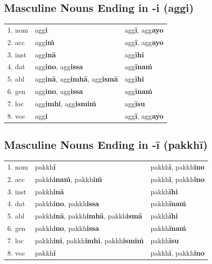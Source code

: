 \documentclass[11pt,oneside]{memoir}
\begin{document}
\subsection{Masculine Nouns Ending in -i (aggi)}
\label{sec:orgc8534b9}

\begin{center}
\begin{tabular}{lll}
1. nom & agg\textbf{i} & agg\textbf{ī}, agg\textbf{ayo}\\
2. acc & agg\textbf{iṁ} & agg\textbf{ī}, agg\textbf{ayo}\\
3. inst & agg\textbf{inā} & agg\textbf{īhi}\\
4. dat & agg\textbf{ino}, agg\textbf{issa} & agg\textbf{īnaṁ}\\
5. abl & agg\textbf{inā}, agg\textbf{imhā}, agg\textbf{ismā} & agg\textbf{īhi}\\
6. gen & agg\textbf{ino}, agg\textbf{issa} & agg\textbf{īnaṁ}\\
7. loc & agg\textbf{imhi}, agg\textbf{ismiṁ} & agg\textbf{īsu}\\
8. voc & agg\textbf{i} & agg\textbf{ī}, agg\textbf{ayo}\\
\end{tabular}
\end{center}
\subsection{Masculine Nouns Ending in -ī (pakkhī)}
\label{sec:orge1f960e}

\begin{center}
\begin{tabular}{lll}
1. nom & pakkh\textbf{ī} & pakkh\textbf{ī}, pakkh\textbf{ino}\\
2. acc & pakkh\textbf{inaṁ}, pakkh\textbf{iṁ} & pakkh\textbf{ī}, pakkh\textbf{ino}\\
3. inst & pakkh\textbf{inā} & pakkh\textbf{īhi}\\
4. dat & pakkh\textbf{ino}, pakkh\textbf{issa} & pakkh\textbf{īnaṁ}\\
5. abl & pakkh\textbf{inā}, pakkh\textbf{imhā}, pakkh\textbf{ismā} & pakkh\textbf{īhi}\\
6. gen & pakkh\textbf{ino}, pakkh\textbf{issa} & pakkh\textbf{īnaṁ}\\
7. loc & pakkh\textbf{ini}, pakkh\textbf{imhi}, pakkh\textbf{ismiṁ} & pakkh\textbf{īsu}\\
8. voc & pakkh\textbf{ī} & pakkh\textbf{ī}, pakkh\textbf{ino}\\
\end{tabular}
\end{center}
\end{document}
